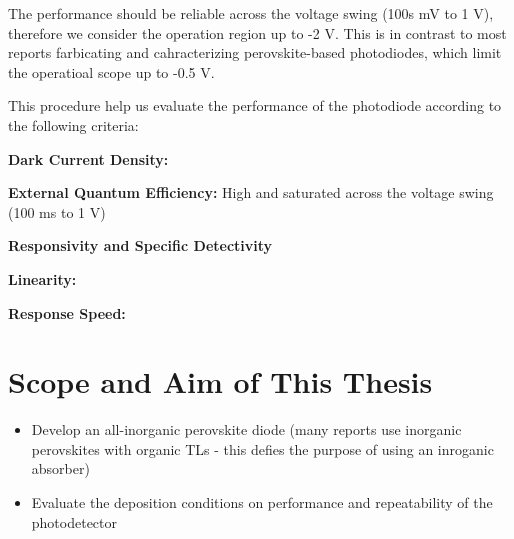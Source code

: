 The performance should be reliable across the voltage swing (100s mV to 1 V), therefore we consider the operation region up to -2 V. This is in contrast to most reports farbicating and cahracterizing perovskite-based photodiodes, which limit the operatioal scope up to -0.5 V.

This procedure help us evaluate the performance of the photodiode according to the following criteria: 

\textbf{Dark Current Density:}

\textbf{External Quantum Efficiency:}
High and saturated across the voltage swing (100 ms to 1 V)

\textbf{Responsivity and Specific Detectivity}

\textbf{Linearity:}

\textbf{Response Speed:}


\section{Scope and Aim of This Thesis}

\begin{itemize}
    \item Develop an all-inorganic perovskite diode (many reports use inorganic perovskites with organic TLs - this defies the purpose of using an inroganic absorber)
    \item Evaluate the deposition conditions on performance and repeatability of the photodetector
\end{itemize}


\cleardoublepage

